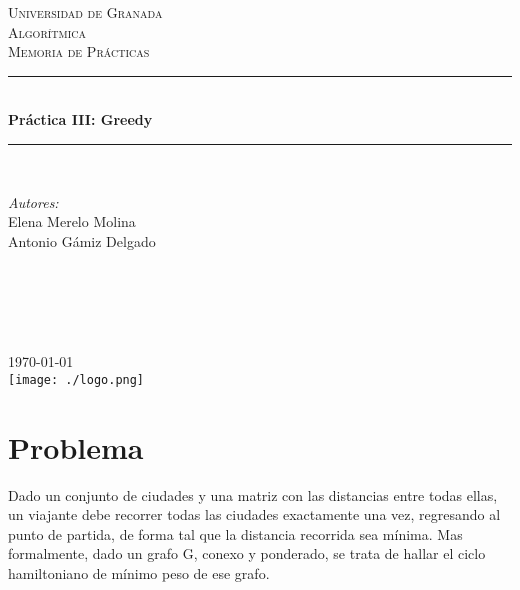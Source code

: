 \documentclass[11pt]{article}
\begin{document}
\begin{titlepage}
\newcommand{\HRule}{\rule{\linewidth}{0.5mm}}
\center
\textsc{\LARGE Universidad de Granada}\\[1.5cm] %
\textsc{\Large Algorítmica}\\[0.5cm] %
\textsc{\large Memoria de Prácticas}\\[0.5cm] %
\HRule \\[0.4cm]
{ \huge \bfseries Práctica III: Greedy}\\[0.4cm] %
\HRule \\[1.5cm]
\begin{minipage}{0.4\textwidth}
\begin{flushleft} \large
\emph{Autores:}\\
Elena Merelo Molina \\
Antonio Gámiz Delgado\textsc{} %
\end{flushleft}
\end{minipage}
~
\begin{minipage}{0.4\textwidth}
\begin{flushright} \large
\emph{} \\
\textsc{} %
\end{flushright}
\end{minipage}\\[2cm]
{\large \today}\\[2cm] %
\texttt{[image: ./logo.png]}\\[1cm]
\vfill %
\end{titlepage}

\section{Problema}

Dado un conjunto de ciudades y una matriz con las distancias entre todas ellas, un viajante debe recorrer todas las ciudades exactamente una vez, regresando al punto de partida, de forma tal que la distancia recorrida sea mínima. Mas formalmente, dado un grafo G, conexo y ponderado, se trata de hallar el ciclo hamiltoniano de mínimo peso de ese grafo.
\end{document}
